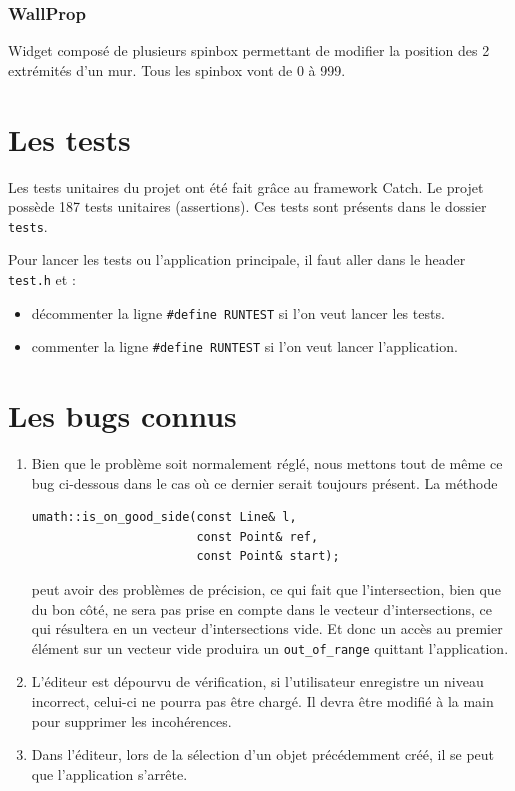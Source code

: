 \documentclass[]{report}
\begin{document}
\subsubsection{\label{WallProp}WallProp}

Widget composé de plusieurs spinbox permettant de modifier la position des 2 extrémités d’un mur. Tous les spinbox vont de 0 à 999.

\newpage
\section{Les tests}

Les tests unitaires du projet ont été fait grâce au framework Catch. Le projet possède 187 tests unitaires (assertions).
Ces tests sont présents dans le dossier \texttt{tests}.

Pour lancer les tests ou l'application principale, il faut aller dans le header \texttt{test.h} et :
\begin{itemize}
\item décommenter la ligne \texttt{\#define RUNTEST} si l'on veut lancer les tests.
\item commenter la ligne \texttt{\#define RUNTEST} si l'on veut lancer l'application.
\end{itemize}

\section{Les bugs connus}

\begin{enumerate}
\item Bien que le problème soit normalement réglé, nous mettons tout de même ce bug ci-dessous dans le cas où ce dernier
serait toujours présent.
La méthode 
\begin{lstlisting}
umath::is_on_good_side(const Line& l, 
                       const Point& ref,
                       const Point& start);
\end{lstlisting}
peut avoir des problèmes de précision, ce qui fait que l'intersection, bien que du bon côté, ne sera pas 
prise en compte dans le vecteur d'intersections, ce qui résultera en un vecteur d'intersections vide. Et donc un
accès au premier élément sur un vecteur vide produira un \texttt{out\_of\_range} quittant l'application.


\item L'éditeur est dépourvu de vérification, si l'utilisateur enregistre un niveau incorrect, celui-ci ne pourra pas être chargé. 
Il devra être modifié à la main pour supprimer les incohérences.
\item Dans l'éditeur, lors de la sélection d'un objet précédemment créé, il se peut que l'application s'arrête.
\end{enumerate}
\end{document}
